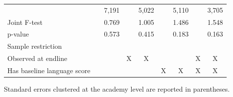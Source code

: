 \begin{table}[htbp]
\begin{threeparttable}
\begin{tabular}{lcccccccc}
          &       & 7,191 &       & 5,022 &       & 5,110 &       & 3,705 \\
    Joint F-test &       & 0.769 &       & 1.005 &       & 1.486 &       & 1.548 \\
    p-value &       & 0.573 &       & 0.415 &       & 0.183 &       & 0.163 \\
    \midrule
    Sample restriction &       &       &       &       &       &       &       &  \\
    Observed at endline &       &       & X     & X     &       &       & X     & X \\
    Has baseline language score &       &       &       &       & X     & X     & X     & X \\
    \bottomrule
    \bottomrule
    \end{tabular}%
    \end{threeparttable}
    
    \begin{tablenotes}
    \item Standard errors clustered at the academy level are reported in parentheses.
    \end{tablenotes}
  \label{tab:balance}%
\end{table}%